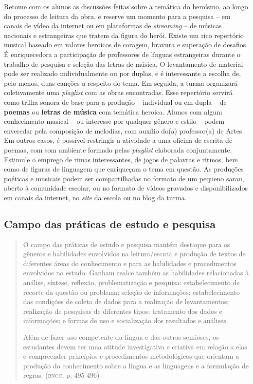 \documentclass{extarticle}
\begin{document}
  Retome com os alunos as discussões feitas sobre a temática do
  heroísmo, ao longo do processo de leitura da obra, e reserve um
  momento para a pesquisa -- em canais de vídeo da internet ou em
  plataformas de \emph{streaming} -- de músicas nacionais e estrangeiras
  que tratem da figura do herói. Existe um rico repertório musical
  baseado em valores heroicos de coragem, bravura e superação de
  desafios. É enriquecedora a participação de professores de línguas
  estrangeiras durante o trabalho de pesquisa e seleção das letras de
  música. O levantamento de material pode ser realizado individualmente
  ou por duplas, e é interessante a escolha de, pelo menos, duas canções
  a respeito do tema. Em seguida, a turma organizará coletivamente uma
  \emph{playlist} com as obras encontradas. Esse repertório servirá como
  trilha sonora de base para a produção -- individual ou em dupla -- de
  \textbf{poemas} ou \textbf{letras de música} com temática heroica.
  Alunos com algum conhecimento musical -- ou interesse por qualquer
  gênero e estilo -- podem enveredar pela composição de melodias, com
  auxílio do(a) professor(a) de Artes. Em outros casos, é possível
  restringir a atividade a uma oficina de escrita de poemas, com som
  ambiente formado pelas \emph{playlist} elaborada conjuntamente.
  Estimule o emprego de rimas interessantes, de jogos de palavras e
  ritmos, bem como de figuras de linguagem que enriqueçam o tema em
  questão. As produções poéticas e musicais podem ser compartilhadas no
  formato de um pequeno sarau, aberto à comunidade escolar, ou no
  formato de vídeos gravados e disponibilizados em canais da internet,
  no \emph{site} da escola ou no blog da turma.

\subsection{Campo das práticas de estudo e pesquisa}

\begin{quote}
O campo das práticas de estudo e pesquisa mantém destaque para os
gêneros e habilidades envolvidos na leitura/escuta e produção de textos
de diferentes áreas do conhecimento e para as habilidades e
procedimentos envolvidos no estudo. Ganham realce também as habilidades
relacionadas à análise, síntese, reflexão, problematização e pesquisa:
estabelecimento de recorte da questão ou problema; seleção de
informações; estabelecimento das condições de coleta de dados para a
realização de levantamentos; realização de pesquisas de diferentes
tipos; tratamento dos dados e informações; e formas de uso e
socialização dos resultados e análises.

Além de fazer uso competente da língua e das outras semioses, os
estudantes devem ter uma atitude investigativa e criativa em relação a
elas e compreender princípios e procedimentos metodológicos que orientam
a produção do conhecimento sobre a língua e as linguagens e a formulação
de regras. (\textsc{bncc}, p. 495-496)
\end{quote}
\end{document}
